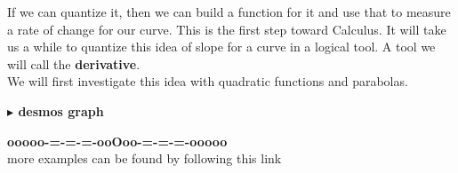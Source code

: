 \documentclass{ximera}
\begin{document}
If we can quantize it, then we can build a function for it and use that to measure a rate of change for our curve. This is the first step toward Calculus. It will take us a while to quantize this idea of slope for a curve in a logical tool. A tool we will call the \textbf{derivative}.\\

We will first investigate this idea with quadratic functions and parabolas. 








\textbf{\textcolor{blue!55!black}{$\blacktriangleright$ desmos graph}} 
\begin{center}
\end{center}


















\begin{center}
\textbf{\textcolor{green!50!black}{ooooo-=-=-=-ooOoo-=-=-=-ooooo}} \\

more examples can be found by following this link\\ 

\end{center}
\end{document}
